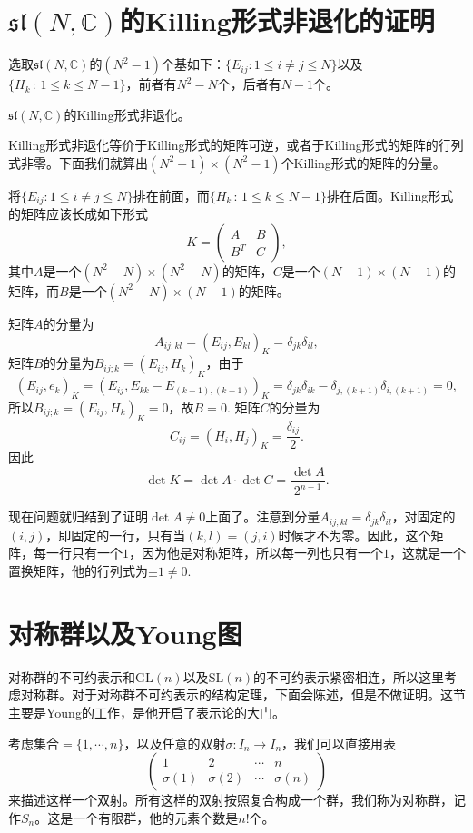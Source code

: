 \documentclass[11pt]{article}
\theoremstyle{definition}
\theoremstyle{plain}
\newcommand{\cc}{\mathbb{C}}
\begin{document}
\clearpage
\section{$\mathfrak{sl}(N,\cc)$的Killing形式非退化的证明}

选取$\mathfrak{sl}(N,\cc)$的$(N^2-1)$个基如下：$\{E_{ij}:1\leq i\neq j \leq N\}$以及$\{H_k\,:\, 1\leq k \leq N-1\}$，前者有$N^2-N$个，后者有$N-1$个。

{\pro $\mathfrak{sl}(N,\cc)$的Killing形式非退化。\endpro}

\proof Killing形式非退化等价于Killing形式的矩阵可逆，或者于Killing形式的矩阵的行列式非零。下面我们就算出$(N^2-1)\times (N^2-1)$个Killing形式的矩阵的分量。

将$\{E_{ij}:1\leq i\neq j \leq N\}$排在前面，而$\{H_k\,:\, 1\leq k \leq N-1\}$排在后面。Killing形式的矩阵应该长成如下形式
\[
K=\begin{pmatrix}
A&B\\
B^T&C
\end{pmatrix},
\]
其中$A$是一个$(N^2-N)\times (N^2-N)$的矩阵，$C$是一个$(N-1)\times (N-1)$的矩阵，而$B$是一个$(N^2-N)\times (N-1)$的矩阵。

矩阵$A$的分量为
\[
	A_{ij;kl}=(E_{ij},E_{kl})_K=\delta_{jk}\delta_{il},
\]
矩阵$B$的分量为$B_{ij;k}=(E_{ij},H_k)_K$，由于
\[
	(E_{ij},e_k)_K=(E_{ij},E_{kk}-E_{(k+1),(k+1)})_K=\delta_{jk}\delta_{ik}-\delta_{j,(k+1)}\delta_{i,(k+1)}=0,
\]
所以$B_{ij;k}=(E_{ij},H_k)_K=0$，故$B=0$. 矩阵$C$的分量为
\[
	C_{ij}=(H_i,H_j)_K=\frac{\delta_{ij}}{2}.
\]
因此
\[
\det K =\det A \cdot \det C = \frac{\det A}{2^{n-1}}.
\]

现在问题就归结到了证明$\det A\neq 0$上面了。注意到分量$A_{ij;kl}=\delta_{jk}\delta_{il}$，对固定的$(i,j)$，即固定的一行，只有当$(k,l)=(j,i)$时候才不为零。因此，这个矩阵，每一行只有一个$1$，因为他是对称矩阵，所以每一列也只有一个$1$，这就是一个置换矩阵，他的行列式为$\pm 1\neq 0$. \endproof
\clearpage

\section{对称群以及Young图}

对称群的不可约表示和$\mathrm{GL}(n)$以及$\mathrm{SL}(n)$的不可约表示紧密相连，所以这里考虑对称群。对于对称群不可约表示的结构定理，下面会陈述，但是不做证明。这节主要是Young的工作，是他开启了表示论的大门。

\para 考虑集合$=\{1,\cdots,n\}$，以及任意的双射$\sigma : I_n\to I_n$，我们可以直接用表
\[
	\begin{pmatrix}
	1&2&\cdots &n\\
	\sigma(1)&\sigma(2)&\cdots &\sigma(n)
	\end{pmatrix}
\]
来描述这样一个双射。所有这样的双射按照复合构成一个群，我们称为对称群，记作$S_n$。这是一个有限群，他的元素个数是$n!$个。
\end{document}
